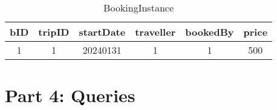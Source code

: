 \documentclass{article}
\begin{document}
\begin{table}[H]
    \centering
    \caption*{BookingInstance}
    \begin{tabular}{|c|c|c|c|c|c|}
    \hline
    bID & tripID & startDate & traveller & bookedBy & price \\ [.5 ex]
    \hline\hline
    1 & 1 & 20240131 & 1 & 1 & 500 \\
    \hline
    \end{tabular}
\end{table}

\newpage

\section*{Part 4: Queries}
\end{document}
